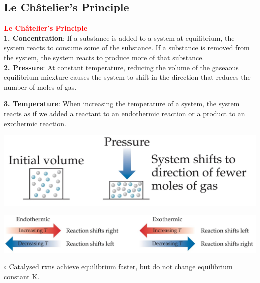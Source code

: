 \subsection{Le Châtelier's Principle}
\textbf{\textcolor{red}{Le Châtelier's Principle}}\\
\textbf{1. Concentration}: If a substance is added to a system at equilibrium, the system reacts to consume some of the substance. If a substance is removed from the system, the system reacts to produce more of that substance. \\
\textbf{2. Pressure}: At constant temperature, reducing the volume of the gaseaous equilibrium micxture causes the system to shift in the direction that reduces the number of moles of gas.\\
\begin{minipage}{0.6\linewidth}
\textbf{3. Temperature}: When increasing the temperature of a system, the system reacts as if we added a reactant to an endothermic reaction or a product to an exothermic reaction. 
\end{minipage}
\begin{minipage}{0.39\linewidth}
\begin{center}
    \includegraphics[width = 0.95\linewidth]{images/Pressure_le_ chatelier.jpeg}
\end{center}
\end{minipage}
\begin{center}
    \includegraphics[width = 0.95\linewidth]{images/exothermic_vs_endothermic.jpeg}
\end{center}
$\circ$ Catalysed rxns achieve equilibrium faster, but do not change equilibrium constant K.\\
